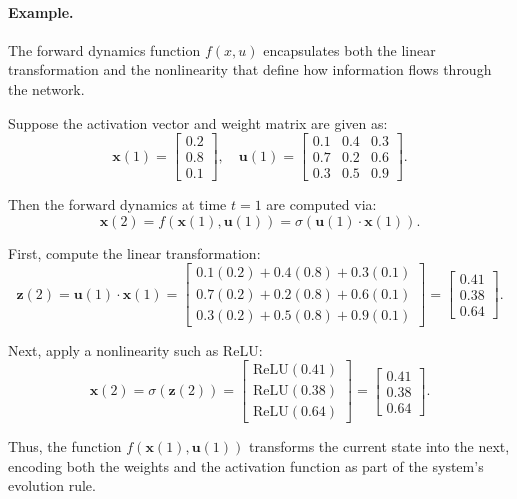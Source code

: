 \paragraph{Example.} The forward dynamics function \(f(x, u)\) encapsulates both the linear transformation and the nonlinearity that define how information flows through the network.

Suppose the activation vector and weight matrix are given as:
\[
\mathbf{x}(1) = 
\begin{bmatrix}
0.2 \\
0.8 \\
0.1
\end{bmatrix}, \quad
\mathbf{u}(1) =
\begin{bmatrix}
0.1 & 0.4 & 0.3 \\
0.7 & 0.2 & 0.6 \\
0.3 & 0.5 & 0.9
\end{bmatrix}.
\]

Then the forward dynamics at time \( t = 1 \) are computed via:
\[
\mathbf{x}(2) = f(\mathbf{x}(1), \mathbf{u}(1)) = \sigma(\mathbf{u}(1) \cdot \mathbf{x}(1)).
\]

First, compute the linear transformation:
\[
\mathbf{z}(2) = \mathbf{u}(1) \cdot \mathbf{x}(1) =
\begin{bmatrix}
0.1(0.2) + 0.4(0.8) + 0.3(0.1) \\
0.7(0.2) + 0.2(0.8) + 0.6(0.1) \\
0.3(0.2) + 0.5(0.8) + 0.9(0.1)
\end{bmatrix}
=
\begin{bmatrix}
0.41 \\
0.38 \\
0.64
\end{bmatrix}.
\]

Next, apply a nonlinearity such as ReLU:
\[
\mathbf{x}(2) = \sigma(\mathbf{z}(2)) = 
\begin{bmatrix}
\text{ReLU}(0.41) \\
\text{ReLU}(0.38) \\
\text{ReLU}(0.64)
\end{bmatrix}
=
\begin{bmatrix}
0.41 \\
0.38 \\
0.64
\end{bmatrix}.
\]

Thus, the function \(f(\mathbf{x}(1), \mathbf{u}(1))\) transforms the current state into the next, encoding both the weights and the activation function as part of the system's evolution rule.






